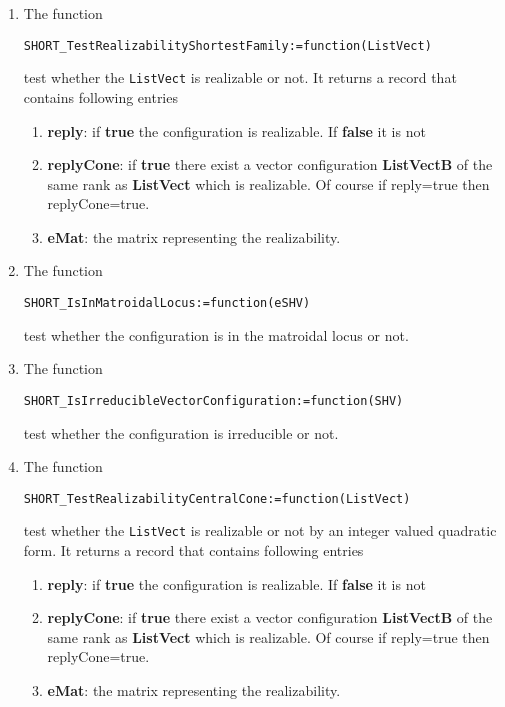 \documentclass[12pt]{amsart}
\begin{document}
\begin{enumerate}
\item The function
\begin{verbatim}
SHORT_TestRealizabilityShortestFamily:=function(ListVect)
\end{verbatim}
test whether the {\tt ListVect} is realizable or not. It returns a record that contains following entries
\begin{enumerate}
\item {\bf reply}: if {\bf true} the configuration is realizable. If {\bf false} it is not
\item {\bf replyCone}: if {\bf true} there exist a vector configuration {\bf ListVectB} of the same rank as {\bf ListVect} which is realizable. Of course if reply=true then replyCone=true.
\item {\bf eMat}: the matrix representing the realizability.
\end{enumerate}

\item The function
\begin{verbatim}
SHORT_IsInMatroidalLocus:=function(eSHV)
\end{verbatim}
test whether the configuration is in the matroidal locus or not.

\item The function
\begin{verbatim}
SHORT_IsIrreducibleVectorConfiguration:=function(SHV)
\end{verbatim}
test whether the configuration is irreducible or not.
  

\item The function
\begin{verbatim}
SHORT_TestRealizabilityCentralCone:=function(ListVect)
\end{verbatim}
test whether the {\tt ListVect} is realizable or not by an integer valued quadratic form. It returns a record that contains following entries
\begin{enumerate}
\item {\bf reply}: if {\bf true} the configuration is realizable. If {\bf false} it is not
\item {\bf replyCone}: if {\bf true} there exist a vector configuration {\bf ListVectB} of the same rank as {\bf ListVect} which is realizable. Of course if reply=true then replyCone=true.
\item {\bf eMat}: the matrix representing the realizability.
\end{enumerate}
  
  
  
\end{enumerate}
\end{document}
